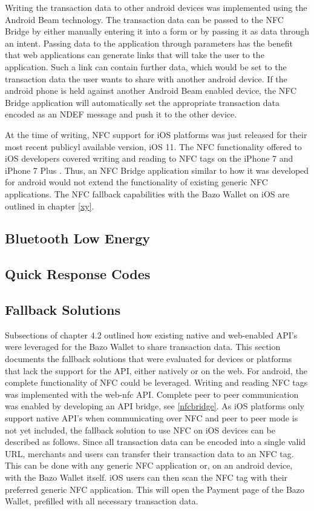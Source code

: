 Writing the transaction data to other android devices was implemented using the Android Beam technology.
The transaction data can be passed to the NFC Bridge by either manually entering it into a form or by passing it as data through an intent. Passing data to the application through parameters has the benefit that web applications can generate links that will take the user to the application. Such a link can contain further data, which would be set to the transaction data the user wants to share with another android device.
If the android phone is held against another Android Beam enabled device, the NFC Bridge application will automatically set the appropriate transaction data encoded as an NDEF message and push it to the other device.

At the time of writing, NFC support for iOS platforms was just released for their most recent publicyl available version, iOS 11. The NFC functionality offered to iOS developers covered writing and reading to NFC tags on the iPhone 7 and iPhone 7 Plus \cite{corenfc}. Thus, an NFC Bridge application similar to how it was developed for android would not extend the functionality of existing generic NFC applications. The NFC fallback capabilities with the Bazo Wallet on iOS are outlined in chapter \ref{xy}.
\subsection{Bluetooth Low Energy}
\subsection{Quick Response Codes}
\subsection{Fallback Solutions}
Subsections of chapter 4.2 outlined how existing native and web-enabled API's were leveraged for the Bazo Wallet to share transaction data. This section documents the fallback solutions that were evaluated for devices or platforms that lack the support for the API, either natively or on the web.
For android, the complete functionality of NFC could be leveraged. Writing and reading NFC tags was implemented with the web-nfc API. Complete peer to peer communication was enabled by developing an API bridge, see \ref{nfcbridge}.
As iOS platforms only support native API's when communicating over NFC and peer to peer mode is not yet included, the fallback solution to use NFC on iOS devices can be described as follows. Since all transaction data can be encoded into a single valid URL, merchants and users can transfer their transaction data to an NFC tag. This can be done with any generic NFC application or, on an android device, with the Bazo Wallet itself. iOS users can then scan the NFC tag with their preferred generic NFC application. This will open the Payment page of the Bazo Wallet, prefilled with all necessary transaction data.
